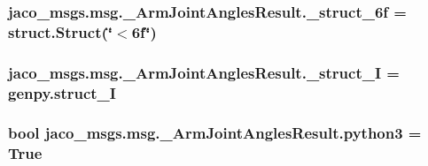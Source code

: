 \subsubsection[{\texorpdfstring{\+\_\+struct\+\_\+6f}{_struct_6f}}]{\setlength{\rightskip}{0pt plus 5cm}jaco\+\_\+msgs.\+msg.\+\_\+\+Arm\+Joint\+Angles\+Result.\+\_\+struct\+\_\+6f = struct.\+Struct(\char`\"{}$<$6f\char`\"{})\hspace{0.3cm}{\ttfamily [private]}}\hypertarget{namespacejaco__msgs_1_1msg_1_1__ArmJointAnglesResult_a5cd4c953e3cb72d48f6f3a42b1eb862d}{}\label{namespacejaco__msgs_1_1msg_1_1__ArmJointAnglesResult_a5cd4c953e3cb72d48f6f3a42b1eb862d}
\subsubsection[{\texorpdfstring{\+\_\+struct\+\_\+I}{_struct_I}}]{\setlength{\rightskip}{0pt plus 5cm}jaco\+\_\+msgs.\+msg.\+\_\+\+Arm\+Joint\+Angles\+Result.\+\_\+struct\+\_\+I = genpy.\+struct\+\_\+I\hspace{0.3cm}{\ttfamily [private]}}\hypertarget{namespacejaco__msgs_1_1msg_1_1__ArmJointAnglesResult_a6dbd5beb52fed045449ec9522575594e}{}\label{namespacejaco__msgs_1_1msg_1_1__ArmJointAnglesResult_a6dbd5beb52fed045449ec9522575594e}
\subsubsection[{\texorpdfstring{python3}{python3}}]{\setlength{\rightskip}{0pt plus 5cm}bool jaco\+\_\+msgs.\+msg.\+\_\+\+Arm\+Joint\+Angles\+Result.\+python3 = True}\hypertarget{namespacejaco__msgs_1_1msg_1_1__ArmJointAnglesResult_a99a6b58960b411a6cbd6f8d01cbc59c9}{}\label{namespacejaco__msgs_1_1msg_1_1__ArmJointAnglesResult_a99a6b58960b411a6cbd6f8d01cbc59c9}
